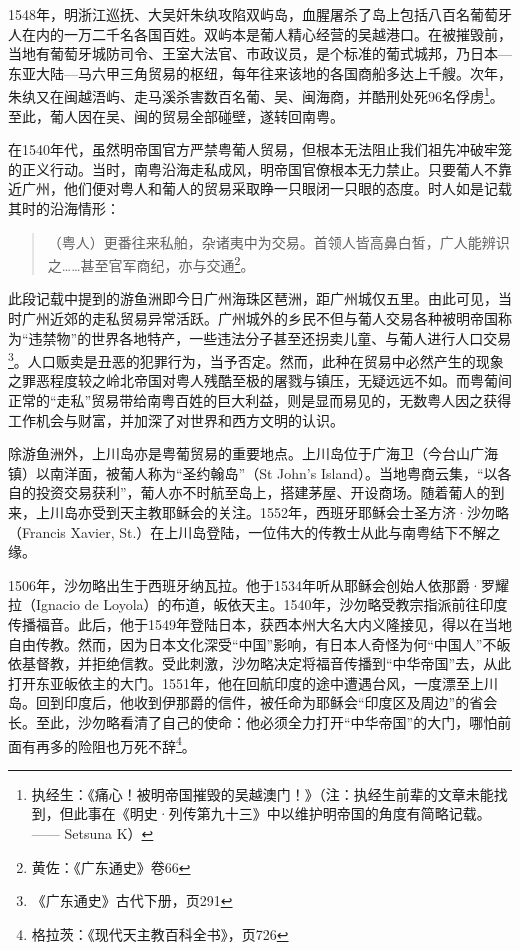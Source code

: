 \indent 1548年，明浙江巡抚、大吴奸朱纨攻陷双屿岛，血腥屠杀了岛上包括八百名葡萄牙人在内的一万二千名各国百姓。双屿本是葡人精心经营的吴越港口。在被摧毁前，当地有葡萄牙城防司令、王室大法官、市政议员，是个标准的葡式城邦，乃日本—东亚大陆—马六甲三角贸易的枢纽，每年往来该地的各国商船多达上千艘。次年，朱纨又在闽越浯屿、走马溪杀害数百名葡、吴、闽海商，并酷刑处死96名俘虏\footnote{执经生：《痛心！被明帝国摧毁的吴越澳门！》（注：执经生前辈的文章未能找到，但此事在《明史·列传第九十三》中以维护明帝国的角度有简略记载。—— Setsuna K）}。至此，葡人因在吴、闽的贸易全部碰壁，遂转回南粤。

在1540年代，虽然明帝国官方严禁粤葡人贸易，但根本无法阻止我们祖先冲破牢笼的正义行动。当时，南粤沿海走私成风，明帝国官僚根本无力禁止。只要葡人不靠近广州，他们便对粤人和葡人的贸易采取睁一只眼闭一只眼的态度。时人如是记载其时的沿海情形：

\begin{quote}

（粤人）更番往来私舶，杂诸夷中为交易。首领人皆高鼻白皙，广人能辨识之……甚至官军商纪，亦与交通\footnote{黄佐：《广东通史》卷66}。

\end{quote}

此段记载中提到的游鱼洲即今日广州海珠区琶洲，距广州城仅五里。由此可见，当时广州近郊的走私贸易异常活跃。广州城外的乡民不但与葡人交易各种被明帝国称为“违禁物”的世界各地特产，一些违法分子甚至还拐卖儿童、与葡人进行人口交易\footnote{《广东通史》古代下册，页291}。人口贩卖是丑恶的犯罪行为，当予否定。然而，此种在贸易中必然产生的现象之罪恶程度较之岭北帝国对粤人残酷至极的屠戮与镇压，无疑远远不如。而粤葡间正常的“走私”贸易带给南粤百姓的巨大利益，则是显而易见的，无数粤人因之获得工作机会与财富，并加深了对世界和西方文明的认识。

除游鱼洲外，上川岛亦是粤葡贸易的重要地点。上川岛位于广海卫（今台山广海镇）以南洋面，被葡人称为“圣约翰岛”（St John’s Island）。当地粤商云集，“以各自的投资交易获利”，葡人亦不时航至岛上，搭建茅屋、开设商场。随着葡人的到来，上川岛亦受到天主教耶稣会的关注。1552年，西班牙耶稣会士圣方济·沙勿略（Francis Xavier, St.）在上川岛登陆，一位伟大的传教士从此与南粤结下不解之缘。

1506年，沙勿略出生于西班牙纳瓦拉。他于1534年听从耶稣会创始人依那爵·罗耀拉（Ignacio de Loyola）的布道，皈依天主。1540年，沙勿略受教宗指派前往印度传播福音。此后，他于1549年登陆日本，获西本州大名大内义隆接见，得以在当地自由传教。然而，因为日本文化深受“中国”影响，有日本人奇怪为何“中国人”不皈依基督教，并拒绝信教。受此刺激，沙勿略决定将福音传播到“中华帝国”去，从此打开东亚皈依主的大门。1551年，他在回航印度的途中遭遇台风，一度漂至上川岛。回到印度后，他收到伊那爵的信件，被任命为耶稣会“印度区及周边”的省会长。至此，沙勿略看清了自己的使命：他必须全力打开“中华帝国”的大门，哪怕前面有再多的险阻也万死不辞\footnote{格拉茨：《现代天主教百科全书》，页726}。

